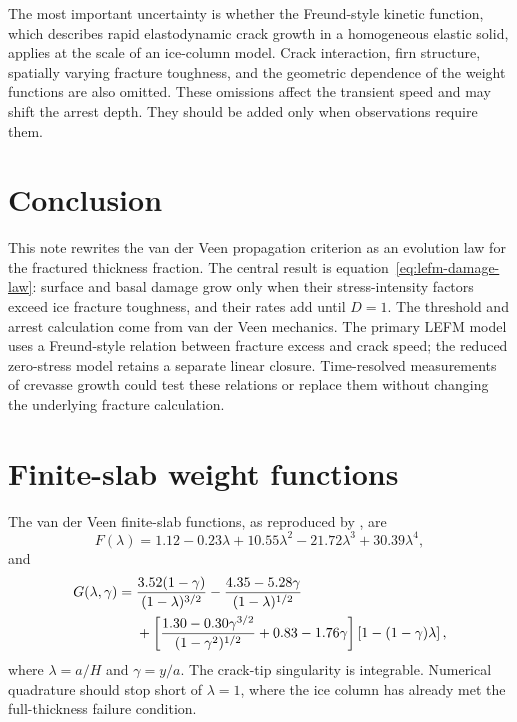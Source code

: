 \documentclass[11pt]{article}
\begin{document}
The most important uncertainty is whether the Freund-style kinetic function,
which describes rapid elastodynamic crack growth in a homogeneous elastic
solid, applies at the scale of an ice-column model.  Crack interaction, firn
structure, spatially varying fracture toughness, and the geometric dependence
of the weight functions are also omitted.  These omissions affect the
transient speed and may shift the arrest depth.  They should be added only
when observations require them.

\section{Conclusion}

This note rewrites the van der Veen propagation criterion as an evolution law
for the fractured thickness fraction.  The central result is
equation~\eqref{eq:lefm-damage-law}: surface and basal damage grow only when
their stress-intensity factors exceed ice fracture toughness, and their rates
add until \(D=1\).  The threshold and arrest calculation come from van der
Veen mechanics.  The primary LEFM model uses a Freund-style relation between
fracture excess and crack speed; the reduced zero-stress model retains a
separate linear closure.  Time-resolved measurements of crevasse growth could
test these relations or replace them without changing the underlying fracture
calculation.

\appendix
\section{Finite-slab weight functions}
\label{sec:weights}

The van der Veen finite-slab functions, as reproduced by
\citet{jimenez2018}, are
\begin{equation}
 F(\lambda)
 =1.12-0.23\lambda+10.55\lambda^2
  -21.72\lambda^3+30.39\lambda^4,
 \label{eq:F}
\end{equation}
and
\begin{align}
 G(\lambda,\gamma)={}&
 \frac{3.52(1-\gamma)}{(1-\lambda)^{3/2}}
 -\frac{4.35-5.28\gamma}{(1-\lambda)^{1/2}}
 \notag\\
 &+\left[
   \frac{1.30-0.30\gamma^{3/2}}{(1-\gamma^2)^{1/2}}
   +0.83-1.76\gamma
 \right]
 \left[1-(1-\gamma)\lambda\right],
 \label{eq:G}
\end{align}
where \(\lambda=a/H\) and \(\gamma=y/a\).  The crack-tip singularity is
integrable.  Numerical quadrature should stop short of \(\lambda=1\), where
the ice column has already met the full-thickness failure condition.



\end{document}
